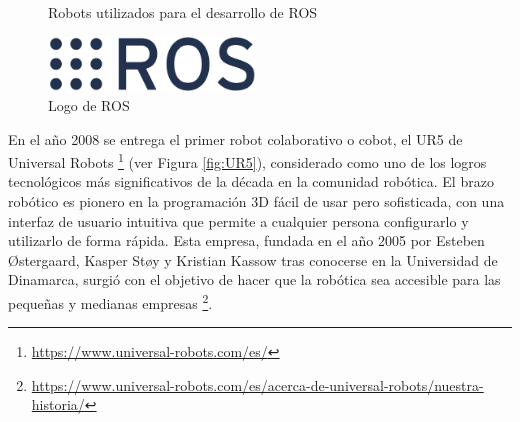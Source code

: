   \begin{figure}[H]
    \begin{center}
      \subcapcentertrue
      \hspace{2mm}
    \end{center}
    \caption{Robots utilizados para el desarrollo de ROS}
    \label{fig:PR_ROS}
  \end{figure}
  
  
  \begin{figure} [H]
    \begin{center}
      \includegraphics[width=55mm]{figs/ROS_logo.png}
    \end{center}
    \caption{Logo de ROS}
    \label{fig:ROS}
  \end{figure}
  
  \pagebreak
  
En el año 2008 se entrega el primer robot colaborativo o cobot, el UR5 de Universal Robots \footnote{\url{https://www.universal-robots.com/es/}} (ver Figura \ref{fig:UR5}), considerado como uno de los logros tecnológicos más significativos de la década en la comunidad robótica. El brazo robótico es pionero en la programación 3D fácil de usar pero sofisticada, con una interfaz de usuario intuitiva que permite a cualquier persona configurarlo y utilizarlo de forma rápida. Esta empresa, fundada en el año 2005 por Esteben Østergaard, Kasper Støy y Kristian Kassow tras conocerse en la Universidad de Dinamarca, surgió con el objetivo de hacer que la robótica sea accesible para las pequeñas y medianas empresas \footnote{\url{https://www.universal-robots.com/es/acerca-de-universal-robots/nuestra-historia/}}.\\
  

